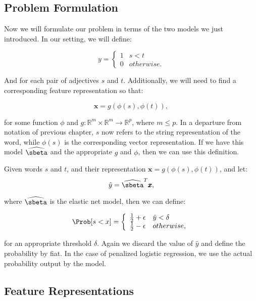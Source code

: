 \subsection{Problem Formulation}

Now we will formulate our problem in terms of the two models we just introduced. In our setting, we will define:

\[   
y = \left\{
\begin{array}{ll}
      1 & s < t \\
      0 & otherwise.
\end{array} 
\right. 
\]

And for each pair of adjectives $s$ and $t$. Additionally, we will need to find a corresponding feature representation so that:

	\[
		\pmb{x} = g(\phi(s), \phi(t)),
	\]

for some function $\phi$ and $g : \mathbb{R}^m \times \mathbb{R}^m \rightarrow \mathbb{R}^p$, where $m \leq p$. In a departure from notation of previous chapter, $s$ now refers to the string representation of the word, while $\phi(s)$ is the corresponding vector representation. If we have this model $\widehat{\sbeta}$ and the appropriate $g$ and $\phi$, then we can use this definition.

\begin{definition}

Given words $s$ and $t$, and their representation $\pmb{x} = g(\phi(s), \phi(t))$, and let:
	\[
		\hat{y} = \widehat{\sbeta}^{T} \pmb{x},
	\]

where $\widehat{\sbeta}$ is the elastic net model, then we can define:

\[   
\Prob[s < x ] = \left\{
\begin{array}{ll}
      \frac{1}{2} + \epsilon & \hat{y} < \delta \\
      \frac{1}{2} - \epsilon & otherwise,
\end{array} 
\right. 
\]

for an appropriate threshold $\delta$. Again we discard the value of $\hat{y}$ and define the probability by fiat. In the case of penalized logistic regression, we use the actual probability output by the model.


\end{definition}

\subsection{Feature Representations}

